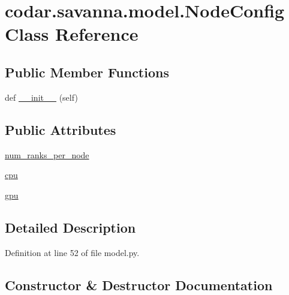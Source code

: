 \hypertarget{classcodar_1_1savanna_1_1model_1_1_node_config}{}\section{codar.\+savanna.\+model.\+Node\+Config Class Reference}
\label{classcodar_1_1savanna_1_1model_1_1_node_config}
\subsection*{Public Member Functions}
\begin{DoxyCompactItemize}
\item 
def \hyperlink{classcodar_1_1savanna_1_1model_1_1_node_config_ad1fad3d3d97b1683dd4d28f77836a002}{\+\_\+\+\_\+init\+\_\+\+\_\+} (self)
\end{DoxyCompactItemize}
\subsection*{Public Attributes}
\begin{DoxyCompactItemize}
\item 
\hyperlink{classcodar_1_1savanna_1_1model_1_1_node_config_abfaac776b1cc5d4b0e6b3dd9d57a32be}{num\+\_\+ranks\+\_\+per\+\_\+node}
\item 
\hyperlink{classcodar_1_1savanna_1_1model_1_1_node_config_ae3b3d48cf476cc01128973780c9ca256}{cpu}
\item 
\hyperlink{classcodar_1_1savanna_1_1model_1_1_node_config_a073c4acfc108df407fbd8ce570bade6b}{gpu}
\end{DoxyCompactItemize}


\subsection{Detailed Description}


Definition at line 52 of file model.\+py.



\subsection{Constructor \& Destructor Documentation}
\mbox{\label{classcodar_1_1savanna_1_1model_1_1_node_config_ad1fad3d3d97b1683dd4d28f77836a002}} 
